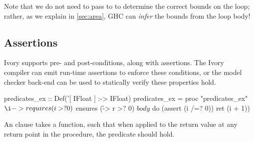 Note that we do not need to pass  to  to determine the
correct bounds on the loop; rather, as we explain in \autoref{sec:area}, GHC can
\emph{infer} the bounds from the loop body!

\subsection{Assertions}

Ivory supports pre- and post-conditions, along with assertions.  The
Ivory compiler can emit run-time assertions to enforce these
conditions, or the model checker back-end can be used to statically
verify these properties hold.

\begin{code}
predicates_ex :: Def('[ IFloat ] :-> IFloat)
predicates_ex = proc "predicates_ex" $
    \i -> requires (i >? 0)
        $ ensures (\r -> r >? 0)
        $ body
        $ do (assert (i /=? 0))
             ret (i + 1))
\end{code}

\noindent
An  clause takes a function, such that when applied to the return
value at any return point in the procedure, the predicate should hold.







